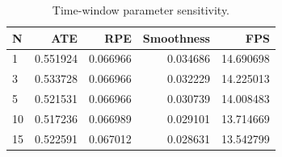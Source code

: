 \begin{table}[t]
\centering
\caption{Time-window parameter sensitivity.}
\label{tab:window_sensitivity}
\begin{tabular}{lrrrr}
\toprule
N & ATE & RPE & Smoothness & FPS \\
\midrule
1 & 0.551924 & 0.066966 & 0.034686 & 14.690698 \\
3 & 0.533728 & 0.066966 & 0.032229 & 14.225013 \\
5 & 0.521531 & 0.066966 & 0.030739 & 14.008483 \\
10 & 0.517236 & 0.066989 & 0.029101 & 13.714669 \\
15 & 0.522591 & 0.067012 & 0.028631 & 13.542799 \\
\bottomrule
\end{tabular}
\end{table}
